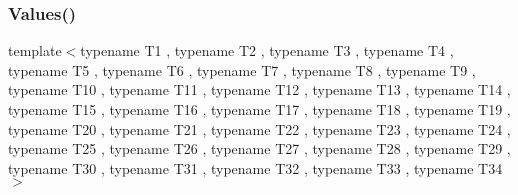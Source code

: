 \mbox{\label{namespacetesting_a37ae9a0b15ed1e02fda22769ef76c97e}} 
\subsubsection{\texorpdfstring{Values()}{Values()}\hspace{0.1cm}{\footnotesize\ttfamily [35/51]}}
{\footnotesize\ttfamily template$<$typename T1 , typename T2 , typename T3 , typename T4 , typename T5 , typename T6 , typename T7 , typename T8 , typename T9 , typename T10 , typename T11 , typename T12 , typename T13 , typename T14 , typename T15 , typename T16 , typename T17 , typename T18 , typename T19 , typename T20 , typename T21 , typename T22 , typename T23 , typename T24 , typename T25 , typename T26 , typename T27 , typename T28 , typename T29 , typename T30 , typename T31 , typename T32 , typename T33 , typename T34 $>$ \\
}
